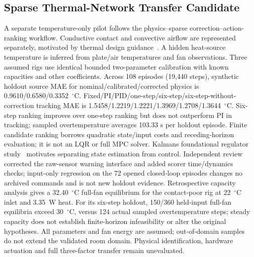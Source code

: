 \documentclass[conference,a4paper]{IEEEtran}
\begin{document}
\subsection{Sparse Thermal-Network Transfer Candidate}
A separate temperature-only pilot follows the physics--sparse correction--action-ranking workflow. Conductive contact and convective airflow are represented separately, motivated by thermal design guidance~\cite{tithermal2017,noctuaduct}. A hidden heat-source temperature is inferred from plate/air temperatures and fan observations. Three assumed rigs use identical bounded two-parameter calibration with known capacities and other coefficients. Across 108 episodes (19,440 steps), synthetic holdout source MAE for nominal/calibrated/corrected physics is 0.9610/0.6580/0.3352~$^\circ$C. Fixed/PI/PID/one-step/six-step/six-step-without-correction tracking MAE is 1.5458/1.2219/1.2221/1.3969/1.2708/1.3644~$^\circ$C. Six-step ranking improves over one-step ranking but does not outperform PI in tracking; sampled overtemperature averages 103.33 s per holdout episode. Finite candidate ranking borrows quadratic state/input costs and receding-horizon evaluation; it is not an LQR or full MPC solver. Kalman\textquotesingle s foundational regulator study~\cite{kalman1960optimal} motivates separating state estimation from control. Independent review corrected the raw-sensor warning interface and added scorer time/dynamics checks; input-only regression on the 72 opened closed-loop episodes changes no archived commands and is not new holdout evidence. Retrospective capacity analysis gives a 32.40~$^\circ$C full-fan equilibrium for the contact-poor rig at 22~$^\circ$C inlet and 3.35~W heat. For its six-step holdout, 150/360 held-input full-fan equilibria exceed 30~$^\circ$C, versus 124 actual sampled overtemperature steps; steady capacity does not establish finite-horizon infeasibility or alter the original hypotheses. All parameters and fan energy are assumed; out-of-domain samples do not extend the validated room domain. Physical identification, hardware actuation and full three-factor transfer remain unevaluated.

\end{document}
